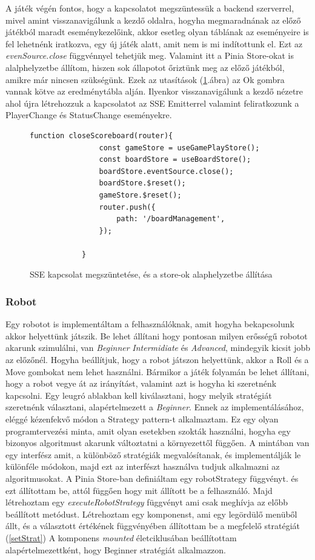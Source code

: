\documentclass[a4paper,twoside]{article}
\begin{document}
A játék végén fontos, hogy a kapcsolatot megszüntessük a backend szerverrel, mivel amint visszanavigálunk a kezdő oldalra, hogyha megmaradnának az előző játékból maradt eseménykezelőink, akkor esetleg olyan táblának az eseményeire is fel lehetnénk iratkozva, egy új játék alatt, amit nem is mi indítottunk el. Ezt az \textit{evenSource.close} függvénnyel tehetjük meg. Valamint itt a Pinia Store-okat is alalphelyzetbe állítom, hiszen sok állapotot őriztünk meg az előző játékból, amikre már nincsen szükségünk. Ezek az utasítások (\ref{reset}.ábra) az Ok gombra vannak kötve az eredménytábla alján. Ilyenkor visszanavigálunk a kezdő nézetre ahol újra létrehozzuk a kapcsolatot az SSE Emitterrel valamint feliratkozunk a PlayerChange és StatusChange eseményekre.  
\begin{figure}
	\caption{SSE kapcsolat megszüntetése, és a store-ok alaphelyzetbe állítása}
	\begin{minipage}{\textwidth}
		\begin{lstlisting}[style=javascriptStyle]
			function closeScoreboard(router){
				const gameStore = useGamePlayStore();
				const boardStore = useBoardStore();
				boardStore.eventSource.close();
				boardStore.$reset();
				gameStore.$reset();
				router.push({
					path: '/boardManagement',
				});
				
			}
		\end{lstlisting}
	\end{minipage}
	
	\label{reset}
\end{figure}
\FloatBarrier
\subsubsection{Robot}
Egy robotot is implementáltam a felhasználóknak, amit hogyha bekapcsolunk akkor helyettünk játszik. Be lehet állítani hogy pontosan milyen erősségű robotot akarunk szimulálni, van \textit{Beginner} \textit{Intermidiate} és \textit{Advanced}, mindegyik kicsit jobb az előzőnél. Hogyha beállítjuk, hogy a robot játszon helyettünk, akkor a Roll és a Move gombokat nem lehet használni. Bármikor a játék folyamán be lehet állítani, hogy a robot vegye át az irányítást, valamint azt is hogyha ki szeretnénk kapcsolni. Egy leugró ablakban kell kiválasztani, hogy melyik stratégiát szeretnénk választani, alapértelmezett a \textit{Beginner}. Ennek az implementálásához, eléggé kézenfekvő módon a Strategy pattern-t alkalmaztam. Ez egy olyan programtervezési minta, amit olyan esetekben szokták használni, hogyha egy bizonyos algoritmust akarunk változtatni a környezettől függően. A mintában van egy interfész amit, a különböző stratégiák megvalósítanak, és implementálják le különféle módokon, majd ezt az interfészt használva tudjuk alkalmazni az algoritmusokat. A Pinia Store-ban definiáltam egy robotStrategy függvényt. és ezt állítottam be, attól függően hogy mit állított be a felhasználó. Majd létrehoztam egy \textit{executeRobotStrategy} függvényt ami csak meghívja az előbb beállított metódust. Létrehoztam egy komponenst, ami egy legördülő menüből állt, és a választott értékének függvényében állítottam be a megfelelő stratégiát (\ref{setStrat}) A komponens \textit{mounted} életciklusában beállítottam alapértelmezettként, hogy Beginner stratégiát alkalmazzon.
\end{document}
